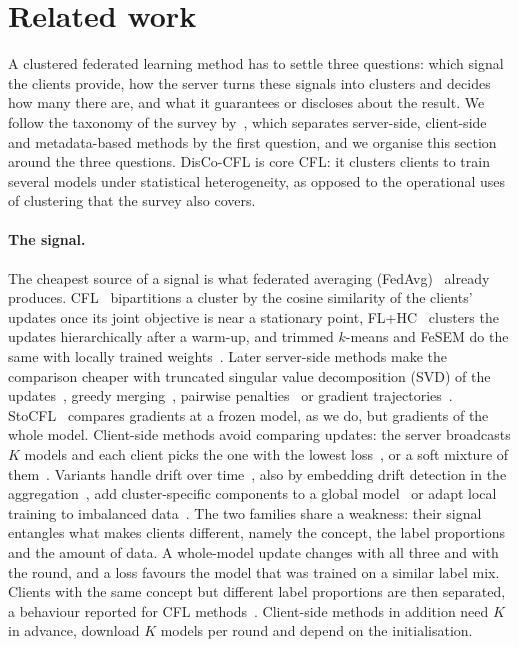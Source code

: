 \section{Related work}\label{sec:related}
A clustered federated learning method has to settle three questions: which signal the clients provide, how the server turns these signals into clusters and decides how many there are, and what it guarantees or discloses about the result. We follow the taxonomy of the survey by~\citet{benali2026survey}, which separates server-side, client-side and metadata-based methods by the first question, and we organise this section around the three questions. DisCo-CFL is core CFL: it clusters clients to train several models under statistical heterogeneity, as opposed to the operational uses of clustering that the survey also covers.

\paragraph{The signal.} The cheapest source of a signal is what federated averaging (FedAvg)~\citep{mcmahan2017fedavg} already produces. CFL~\citep{sattler2021cfl} bipartitions a cluster by the cosine similarity of the clients' updates once its joint objective is near a stationary point, FL+HC~\citep{briggs2020flhc} clusters the updates hierarchically after a warm-up, and trimmed $k$-means and FeSEM do the same with locally trained weights~\citep{ghosh2019robust,long2023fesem}. Later server-side methods make the comparison cheaper with truncated singular value decomposition (SVD) of the updates~\citep{duan2021flexcfl,yan2023icfl}, greedy merging~\citep{mehta2023flacc}, pairwise penalties~\citep{yu2024fpfc} or gradient trajectories~\citep{liu2024cflgt}. StoCFL~\citep{zeng2025stocfl} compares gradients at a frozen model, as we do, but gradients of the whole model. Client-side methods avoid comparing updates: the server broadcasts $K$ models and each client picks the one with the lowest loss~\citep{mansour2020three,ghosh2020ifca}, or a soft mixture of them~\citep{li2021flsc,ruan2022fedsoft,marfoq2021fedem,guo2024fedrc,guo2025hcfl}. Variants handle drift over time~\citep{jothimurugesan2023feddrift}, also by embedding drift detection in the aggregation~\citep{dang2026stfedxids}, add cluster-specific components to a global model~\citep{ma2023fedcam} or adapt local training to imbalanced data~\citep{gong2024autocfl}. The two families share a weakness: their signal entangles what makes clients different, namely the concept, the label proportions and the amount of data. A whole-model update changes with all three and with the round, and a loss favours the model that was trained on a similar label mix. Clients with the same concept but different label proportions are then separated, a behaviour reported for CFL methods~\citep{guo2024fedrc,benali2026survey}. Client-side methods in addition need $K$ in advance, download $K$ models per round and depend on the initialisation.

